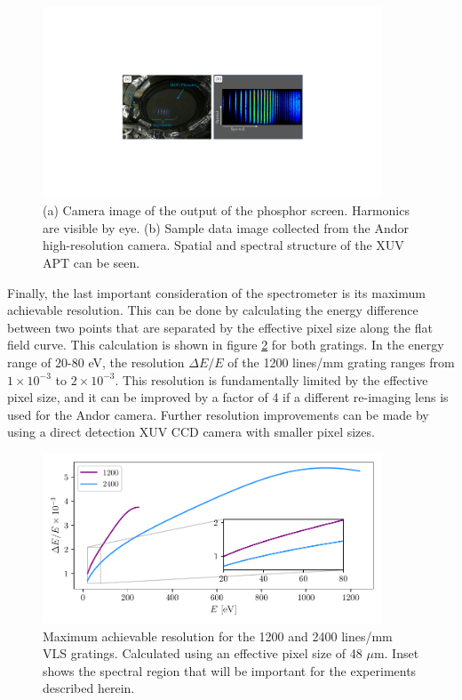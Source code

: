 \begin{figure}
	\centering
	\includegraphics[width=0.9\textwidth]{figures/Beamline/spectrometer_output.pdf}
	\caption[Image of phosphor output of high harmonics generated from two sources and sample data image]{(a) Camera image of the output of the phosphor screen.  Harmonics are visible by eye.  (b) Sample data image collected from the Andor high-resolution camera.  Spatial and spectral structure of the XUV APT can be seen.}
	\label{fig:spectrometer_output}
\end{figure}

Finally, the last important consideration of the spectrometer is its maximum achievable resolution.  This can be done by calculating the energy difference between two points that are separated by the effective pixel size along the flat field curve.  This calculation is shown in figure \ref{fig:grating_resolution} for both gratings.  In the energy range of 20-80 eV, the resolution $\Delta E/E$ of the 1200 lines/mm grating ranges from $1\times10^{-3}$ to $2\times10^{-3}$.  This resolution is fundamentally limited by the effective pixel size, and it can be improved by a factor of 4 if a different re-imaging lens is used for the Andor camera. Further resolution improvements can be made by using a direct detection XUV CCD camera with smaller pixel sizes.
\begin{figure}
	\centering
	\includegraphics[width=0.9\textwidth]{figures/Beamline/grating_resolution.pdf}
	\caption[Maximum achievable resolution for VLS gratings]{Maximum achievable resolution for the 1200 and 2400 lines/mm VLS gratings. Calculated using an effective pixel size of 48 $\mu$m.  Inset shows the spectral region that will be important for the experiments described herein.}
	\label{fig:grating_resolution}
\end{figure}



